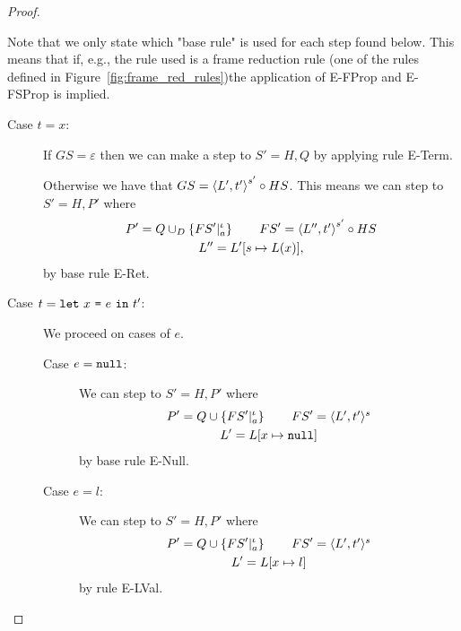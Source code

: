 \begin{proof}
  \begin{remark}
    Note that we only state which "base rule" is used for each step found below.
    This means that if, e.g., the rule used is a frame reduction rule (one of the
    rules defined in Figure~\ref{fig:frame_red_rules})the application of {\sc
    E-FProp} and {\sc E-FSProp} is implied.
  \end{remark}

  \begin{description}
    \item[Case $t = x$:] 
      If $GS = \varepsilon$ then we can make a step to $S' = H, Q$ by applying
      rule {\sc E-Term}.

      Otherwise we have that $GS = \mbox{$\langle L', t' \rangle$}^{s'} \circ HS$. This means we
      can step to $S' = H, P'$ where
      \begin{equation*}
        \begin{gathered}
          P' = Q \cup_D \left\{ FS'|_a^\iota \right\} \quad\quad FS' = \mbox{$\langle L'',
          t' \rangle$}^{s'} \circ HS \\ 
          L'' = L'[s \mapsto L(x)],
        \end{gathered}
      \end{equation*}
      by base rule {\sc E-Ret}. \contradiction
    
    \item[Case $t = \mbox{\mdseries\texttt{let}~$x$~\texttt{=}~$e$~\texttt{in}~$t'$}$:]
      We proceed on cases of $e$.
      \begin{description}
        \item[Case $e = \mbox{\mdseries\texttt{null}}$:] 
          We can step to $S' = H, P'$ where
          \begin{equation*}
            \begin{gathered}
              P' = Q \cup \left\{FS'|_a^\iota \right\} \quad\quad FS' = \mbox{$\langle L',
              t' \rangle^s$} \\
              L' = L[x \mapsto \mbox{\mdseries\texttt{null}}]
            \end{gathered}
          \end{equation*}
          by base rule {\sc E-Null}. \contradiction

        \item[Case $e = l$:]
          We can step to $S' = H, P'$ where 
          \begin{equation*}
            \begin{gathered}
              P' = Q \cup \left\{FS'|_a^\iota \right\} \quad\quad FS' = \mbox{$\langle L',
              t' \rangle^s$} \\
              L' = L[x \mapsto l]
            \end{gathered}
          \end{equation*}
          by rule {\sc E-LVal}. \contradiction


\end{description}
\end{description}
\end{proof}
